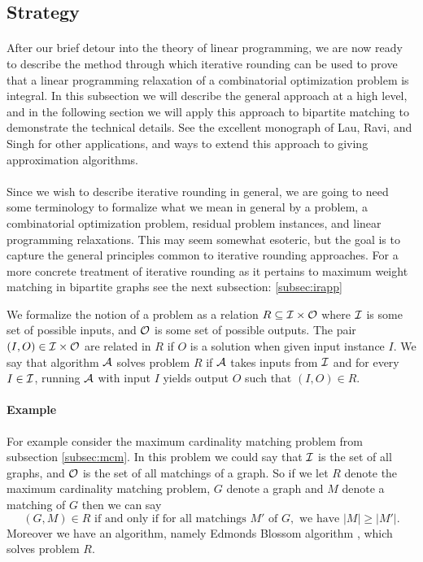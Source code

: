 \subsection{Strategy}
\paragraph{}
After our brief detour into the theory of linear programming, we are now ready to describe the method through which iterative rounding can be used to prove that a linear programming relaxation of a combinatorial optimization problem is integral. In this subsection we will describe the general approach at a high level, and in the following section we will apply this approach to bipartite matching to demonstrate the technical details. See the excellent monograph of Lau, Ravi, and Singh\cite{lau2011iterative} for other applications, and ways to extend this approach to giving approximation algorithms.
\paragraph{}
Since we wish to describe iterative rounding in general, we are going to need some terminology to formalize what we mean in general by a problem, a combinatorial optimization problem, residual problem instances, and linear programming relaxations. This may seem somewhat esoteric, but the goal is to capture the general principles common to iterative rounding approaches. For a more concrete treatment of iterative rounding as it pertains to maximum weight matching in bipartite graphs see the next subsection: \ref{subsec:irapp}
\begin{definition}
We formalize the notion of a problem as a relation $R \subseteq \mathcal{I} \times \mathcal{O}$ where $\mathcal{I}$ is some set of possible inputs, and $\mathcal{O}$ is some set of possible outputs. The pair $(I,O) \in \mathcal{I} \times \mathcal{O}$ are related in $R$ if $O$ is a solution when given input instance $I$. We say that algorithm $\mathcal{A}$ solves problem $R$ if $\mathcal{A}$ takes inputs from $\mathcal{I}$ and for every $I \in \mathcal{I}$, running $\mathcal{A}$ with input $I$ yields output $O$ such that $(I,O) \in R$. 
\end{definition}
\paragraph{Example}
For example consider the maximum cardinality matching problem from subsection \ref{subsec:mcm}. In this problem we could say that $\mathcal{I}$ is the set of all graphs, and $\mathcal{O}$ is the set of all matchings of a graph. So if we let $R$ denote the maximum cardinality matching problem, $G$ denote a graph and $M$ denote a matching of $G$ then we can say $$(G,M) \in R \text{ if and only if for all matchings } M'\text{ of } G, \text{ we have } |M| \geq |M'|.$$
Moreover we have an algorithm, namely Edmonds Blossom algorithm \cite{edmonds1965paths}, which solves problem $R$.
